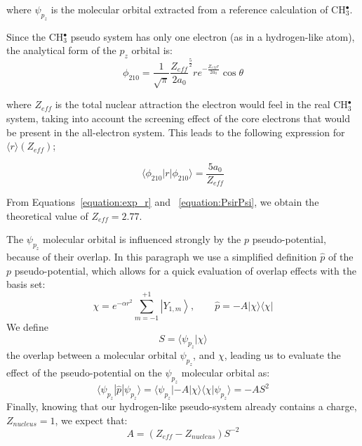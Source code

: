 \documentclass[12pt]{article}
\begin{document}
where \(\psi_{p_{z}}\) is the molecular orbital extracted from a reference calculation of CH\(^{\bullet}_{3}\). 

Since the CH\(^{\bullet}_{3}\) pseudo system has only one electron (as in a hydrogen-like atom), 
the analytical form of the \(p_{z}\) orbital is:~\cite{me_structure_theory} 
\begin{equation}
\label{equation:analyticalpz}
\phi_{210} = \frac{1}{\sqrt{\pi}} \frac{Z_{eff}}{2a_{0}} ^{\frac{5}{2}} re^{-\frac{Z_{eff}r}{2a_{0}}} \cos \theta
\end{equation}

where \(Z_{eff}\) is the total nuclear attraction the electron 
would feel in the real CH\(^{\bullet}_{3}\) system, taking into account the screening effect of the core electrons that would be 
present in the all-electron system.
This leads to the following expression for \( \langle r \rangle (Z_{eff}) \); 

\begin{equation}
\label{equation:PsirPsi}
\langle \phi_{210} | r | \phi_{210} \rangle = \frac{5a_{0}}{Z_{eff}}
\end{equation}

From Equations~\ref{equation:exp_r} and ~\ref{equation:PsirPsi}, we obtain the theoretical value of \(Z_{eff} = 2.77\).

The \(\psi_{p_{z}}\) molecular orbital is influenced strongly by the $p$ pseudo-potential,
because of their overlap. In this paragraph we use a simplified definition $\widehat{p}$ of the $p$ pseudo-potential, which allows for a quick evaluation of overlap effects with the basis set: 
\begin{equation}
\chi = e^{-\alpha r^{2}}\sum_{m=-1}^{+1}\left|Y_{1,m}\right>,\qquad \widehat{p} = -A | \chi \rangle \langle \chi |
\end{equation}
We define
\begin{equation}
S = \langle \psi_{p_{z}} | \chi \rangle
\end{equation}
the overlap between a molecular orbital \(\psi_{p_{z}}\), and \(\chi\),
leading us to evaluate the effect of the pseudo-potential on the \(\psi_{p_{z}}\) molecular orbital as:
\begin{equation}
\langle \psi_{p_{z}} | \widehat{p} | \psi_{p_{z}} \rangle = \langle \psi_{p_{z}} | -A | \chi \rangle \langle \chi | \psi_{p_{z}} \rangle = -A S^{2}
\end{equation}
Finally, knowing that our hydrogen-like pseudo-system already contains a charge, \(Z_{nucleus}=1\), 
we expect that:
\begin{equation}
A = (Z_{eff} - Z_{nucleus})S^{-2}
\label{eqpseudo}
\end{equation}
\end{document}
